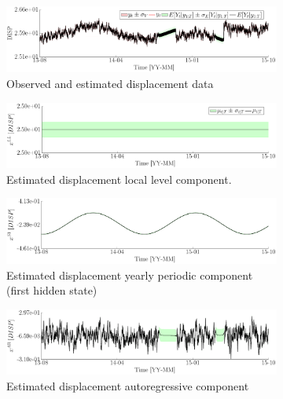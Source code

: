 \begin{figure}[h!]
\begin{center}
\begin{subfigure}{\linewidth}
\centering
\includegraphics[width=0.9\linewidth]{./docfigs/Example_DISP_INTERVENTION/DISP_ObservedPredicted.pdf} 
\caption{Observed and estimated displacement data}
\end{subfigure}
\begin{subfigure}{\linewidth}
\centering
\includegraphics[width=0.9\linewidth]{./docfigs/Example_DISP_INTERVENTION/DISP_LL_1.pdf}
\caption{Estimated displacement local level component.}
\end{subfigure}
\begin{subfigure}{\linewidth}
\centering
\includegraphics[width=0.9\linewidth]{./docfigs/Example_DISP_INTERVENTION/DISP_S1_2.pdf} 
\caption{Estimated displacement yearly periodic component (first hidden state)}
\end{subfigure}
\begin{subfigure}{\linewidth}
\centering
\includegraphics[width=0.9\linewidth]{./docfigs/Example_DISP_INTERVENTION/DISP_AR_6.pdf} 
\caption{Estimated displacement autoregressive component}
\end{subfigure}
\begin{subfigure}{\linewidth}

\end{subfigure}
\end{center}
\end{figure}
